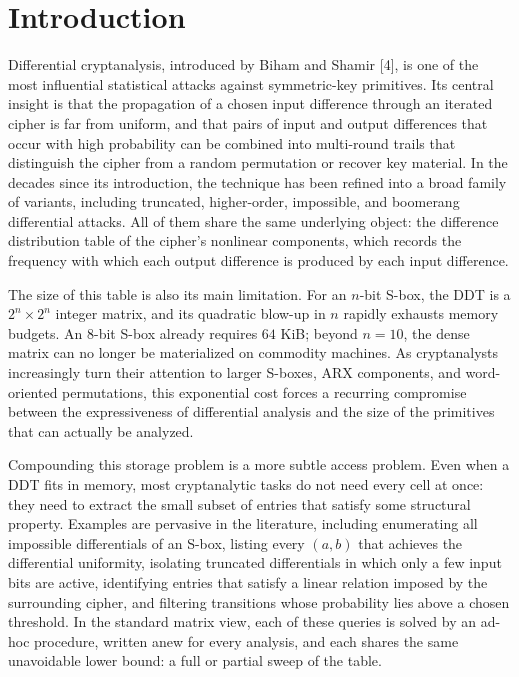 \section{Introduction}
\label{sec:introduction}

Differential cryptanalysis, introduced by Biham and Shamir [4], is one of
the most influential statistical attacks against symmetric-key primitives.
Its central insight is that the propagation of a chosen input difference
through an iterated cipher is far from uniform, and that pairs of input and
output differences that occur with high probability can be combined into
multi-round trails that distinguish the cipher from a random permutation or
recover key material. In the decades since its introduction, the technique
has been refined into a broad family of variants, including truncated,
higher-order, impossible, and boomerang differential attacks. All of them
share the same underlying object: the difference distribution table of the
cipher's nonlinear components, which records the frequency with which each
output difference is produced by each input difference.

The size of this table is also its main limitation. For an $n$-bit S-box,
the DDT is a $2^n \times 2^n$ integer matrix, and its quadratic blow-up in
$n$ rapidly exhausts memory budgets. An $8$-bit S-box already requires $64$
KiB; beyond $n = 10$, the dense matrix can no longer be materialized on
commodity machines. As cryptanalysts increasingly turn their attention to
larger S-boxes, ARX components, and word-oriented permutations, this
exponential cost forces a recurring compromise between the expressiveness of
differential analysis and the size of the primitives that can actually be
analyzed.

Compounding this storage problem is a more subtle access problem. Even when
a DDT fits in memory, most cryptanalytic tasks do not need every cell at
once: they need to extract the small subset of entries that satisfy some
structural property. Examples are pervasive in the literature, including
enumerating all impossible differentials of an S-box, listing every $(a,b)$
that achieves the differential uniformity, isolating truncated differentials
in which only a few input bits are active, identifying entries that satisfy
a linear relation imposed by the surrounding cipher, and filtering
transitions whose probability lies above a chosen threshold. In the standard
matrix view, each of these queries is solved by an ad-hoc procedure, written
anew for every analysis, and each shares the same unavoidable lower bound:
a full or partial sweep of the table.

